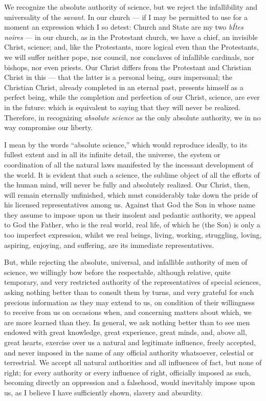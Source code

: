 \documentclass[12pt]{report}
\begin{document}
We recognize the absolute authority of science, but we reject the infallibility and universality of the \emph{savant.} In our church — if I may be permitted to use for a moment an expression which I so detest: Church and State are my two \emph{bÍtes noires} — in our church, as in the Protestant church, we have a chief, an invisible Christ, science; and, like the Protestants, more logical even than the Protestants, we will suffer neither pope, nor council, nor conclaves of infallible cardinals, nor bishops, nor even priests. Our Christ differs from the Protestant and Christian Christ in this — that the latter is a personal being, ours impersonal; the Christian Christ, already completed in an eternal past, presents himself as a perfect being, while the completion and perfection of our Christ, science, are ever in the future: which is equivalent to saying that they will never be realized. Therefore, in recognizing \emph{absolute science} as the only absolute authority, we in no way compromise our liberty.


I mean by the words “absolute science,” which would reproduce ideally, to its fullest extent and in all its infinite detail, the universe, the system or coordination of all the natural laws manifested by the incessant development of the world. It is evident that such a science, the sublime object of all the efforts of the human mind, will never be fully and absolutely realized. Our Christ, then, will remain eternally unfinished, which must considerably take down the pride of his licensed representatives among us. Against that God the Son in whose name they assume to impose upon us their insolent and pedantic authority, we appeal to God the Father, who is the real world, real life, of which he (the Son) is only a too imperfect expression, whilst we real beings, living, working, struggling, loving, aspiring, enjoying, and suffering, are its immediate representatives.


But, while rejecting the absolute, universal, and infallible authority of men of science, we willingly bow before the respectable, although relative, quite temporary, and very restricted authority of the representatives of special sciences, asking nothing better than to consult them by turns, and very grateful for such precious information as they may extend to us, on condition of their willingness to receive from us on occasions when, and concerning matters about which, we are more learned than they. In general, we ask nothing better than to see men endowed with great knowledge, great experience, great minds, and, above all, great hearts, exercise over us a natural and legitimate influence, freely accepted, and never imposed in the name of any official authority whatsoever, celestial or terrestrial. We accept all natural authorities and all influences of fact, but none of right; for every authority or every influence of right, officially imposed as such, becoming directly an oppression and a falsehood, would inevitably impose upon us, as I believe I have sufficiently shown, slavery and absurdity.
\end{document}
